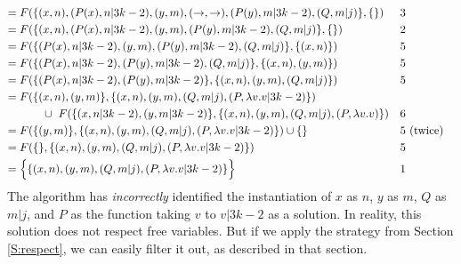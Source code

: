 \documentclass{article}
\begin{document}
\begin{enumerate}
\begin{align*}
		={}	& F(\{	(x,n), (P(x),n|3k-2),
					(y,m), (\to,\to), (P(y),m|3k-2), (Q,m|j) \}, \{\}) & 3 \\
		={}	& F(\{	(x,n), (P(x),n|3k-2), (y,m), (P(y),m|3k-2), (Q,m|j) \}, \{\}) & 2 \\
		={}	& F(\{	(P(x),n|3k-2), (y,m), (P(y),m|3k-2), (Q,m|j) \}, \{(x,n)\}) & 5 \\
		={}	& F(\{	(P(x),n|3k-2), (P(y),m|3k-2), (Q,m|j) \}, \{(x,n),(y,m)\}) & 5 \\
		={}	& F(\{	(P(x),n|3k-2), (P(y),m|3k-2) \}, \{(x,n),(y,m),(Q,m|j)\}) & 5 \\
		={}	& F(\{	(x,n),(y,m) \}, \{(x,n),(y,m),(Q,m|j),(P,\lambda v.v|3k-2)\}) \\
			& \hspace{7mm} \cup ~
			  F(\{	(x,n|3k-2),(y,m|3k-2) \}, \{(x,n),(y,m),(Q,m|j),(P,\lambda v.v)\})
			  	& 6 \\
		={}	& F(\{	(y,m) \}, \{(x,n),(y,m),(Q,m|j),(P,\lambda v.v|3k-2)\}) \cup \{\}
			& 5 & \text{ (twice)} \\
		={}	& F(\{\}, \{(x,n),(y,m),(Q,m|j),(P,\lambda v.v|3k-2)\})	& 5 \\
		={}	& \Big\{\{(x,n),(y,m),(Q,m|j),(P,\lambda v.v|3k-2)\}\Big\}	& 1
		\end{align*}
		The algorithm has \emph{incorrectly} identified the instantiation of $x$ as $n$, $y$ as $m$, $Q$ as $m|j$, and $P$ as the function taking $v$ to $v|3k-2$ as a solution.  In reality, this solution does not respect free variables.  But if we apply the strategy from Section \ref{S:respect}, we can easily filter it out, as described in that section.
		

\end{enumerate}
\end{document}
